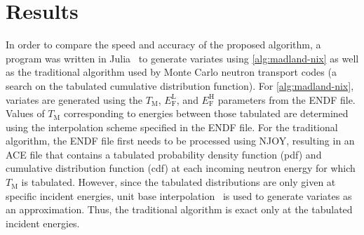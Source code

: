 \documentclass[3p,fleqn]{elsarticle}
\newcommand{\tmax}{T_{\mathrm{M}}}
\newcommand{\efl}{E_{\mathrm{F}}^{\mathrm{L}}}
\newcommand{\efh}{E_{\mathrm{F}}^{\mathrm{H}}}
\begin{document}
\section{Results}

In order to compare the speed and accuracy of the proposed algorithm, a program
was written in Julia~\cite{arxiv-bezanson-2012} to generate variates using
\autoref{alg:madland-nix} as well as the traditional algorithm used by Monte
Carlo neutron transport codes (a search on the tabulated cumulative
distribution function). For \autoref{alg:madland-nix}, variates are generated
using the $\tmax$, $\efl$, and $\efh$ parameters from the ENDF file. Values of
$\tmax$ corresponding to energies between those tabulated are determined using
the interpolation scheme specified in the ENDF file. For the traditional
algorithm, the ENDF file first needs to be processed using NJOY, resulting in
an ACE file that contains a tabulated probability density function (pdf) and
cumulative distribution function (cdf) at each incoming neutron energy for
which $\tmax$ is tabulated. However, since the tabulated distributions are only
given at specific incident energies, unit base
interpolation~\cite{nse-doyas-1972} is used to generate variates as an
approximation. Thus, the traditional algorithm is exact only at the tabulated
incident energies.
\end{document}
